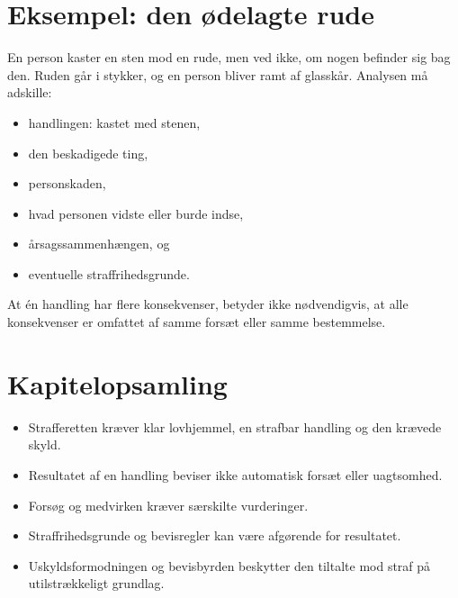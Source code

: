 \section{Eksempel: den ødelagte rude}

En person kaster en sten mod en rude, men ved ikke, om nogen befinder sig bag den. Ruden går i stykker, og en person bliver ramt af glasskår. Analysen må adskille:
\begin{itemize}
  \item handlingen: kastet med stenen,
  \item den beskadigede ting,
  \item personskaden,
  \item hvad personen vidste eller burde indse,
  \item årsagssammenhængen, og
  \item eventuelle straffrihedsgrunde.
\end{itemize}

At én handling har flere konsekvenser, betyder ikke nødvendigvis, at alle konsekvenser er omfattet af samme forsæt eller samme bestemmelse.



\section*{Kapitelopsamling}
\begin{itemize}
  \item Strafferetten kræver klar lovhjemmel, en strafbar handling og den krævede skyld.
  \item Resultatet af en handling beviser ikke automatisk forsæt eller uagtsomhed.
  \item Forsøg og medvirken kræver særskilte vurderinger.
  \item Straffrihedsgrunde og bevisregler kan være afgørende for resultatet.
  \item Uskyldsformodningen og bevisbyrden beskytter den tiltalte mod straf på utilstrækkeligt grundlag.
\end{itemize}
